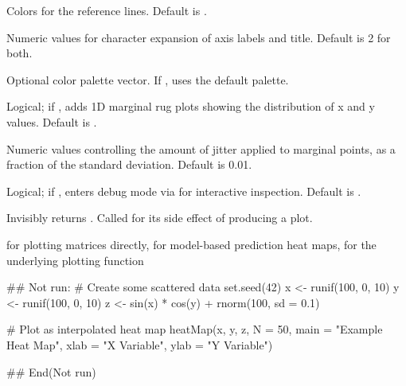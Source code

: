 \documentclass[a4paper]{book}
\begin{document}
\begin{Arguments}
\begin{ldescription}
\item[\code{col\_vline}, \code{col\_hline}] Colors for the reference lines. Default is
.

\item[\code{cex.lab}, \code{cex.main}] Numeric values for character expansion of axis labels
and title. Default is 2 for both.

\item[\code{myCol}] Optional color palette vector. If , uses the default
 palette.

\item[\code{includeMarginals}] Logical; if , adds 1D marginal rug plots
showing the distribution of x and y values. Default is .

\item[\code{marginalJitterSD\_x}, \code{marginalJitterSD\_y}] Numeric values controlling the
amount of jitter applied to marginal points, as a fraction of the standard
deviation. Default is 0.01.

\item[\code{openBrowser}] Logical; if , enters debug mode via
 for interactive inspection. Default is .
\end{ldescription}
\end{Arguments}
%
\begin{Value}
Invisibly returns . Called for its side effect of producing
a plot.
\end{Value}
%
\begin{SeeAlso}
 for plotting matrices directly,
 for model-based prediction heat maps,
 for the underlying plotting function
\end{SeeAlso}
%
\begin{Examples}
\begin{ExampleCode}
## Not run: 
# Create some scattered data
set.seed(42)
x <- runif(100, 0, 10)
y <- runif(100, 0, 10)
z <- sin(x) * cos(y) + rnorm(100, sd = 0.1)

# Plot as interpolated heat map
heatMap(x, y, z, N = 50, main = "Example Heat Map",
        xlab = "X Variable", ylab = "Y Variable")

## End(Not run)

\end{ExampleCode}
\end{Examples}
\end{document}
